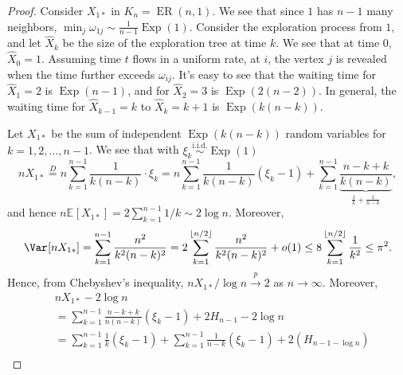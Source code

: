 \begin{proof}
	Consider \(X_{1\ast}\) in \(K_n = \operatorname{ER}(n, 1) \). We see that since \(1\) has \(n-1\) many neighbors, \(\min _j \omega _{1j} \sim \frac{1}{n-1} \operatorname{Exp}(1) \). Consider the exploration process from \(1\), and let \(\hat{X} _k\) be the size of the exploration tree at time \(k\). We see that at time \(0\), \(\hat{X} _0 = 1\). Assuming time \(t\) flows in a uniform rate, at \(i\), the vertex \(j\) is revealed when the time further exceeds \(\omega _{ij}\). It's easy to see that the waiting time for \(\hat{X} _1 = 2\) is \(\operatorname{Exp}(n-1) \), and for \(\hat{X} _2 = 3\) is \(\operatorname{Exp}(2 (n-2)) \). In general, the waiting time for \(\hat{X} _{k-1} = k\) to \(\hat{X} _k = k+1\) is \(\operatorname{Exp}(k (n-k)) \).

	Let \(X_{1 \ast}\) be the sum of independent \(\operatorname{Exp}(k (n-k)) \) random variables for \(k = 1, 2, \dots , n-1\). We see that with \(\xi _k \overset{\text{i.i.d.} }{\sim } \operatorname{Exp}(1) \)
	\[
		n X_{1 \ast}
		\overset{D}{=} n \sum_{k=1}^{n-1} \frac{1}{k (n-k)}\cdot \xi _k
		= n \sum_{k=1}^{n-1} \frac{1}{k (n-k)}(\xi _k - 1) + \sum_{k=1}^{n-1} \underbrace{\frac{n-k+k}{k(n-k)}}_{\frac{1}{k} + \frac{1}{n-k}},
	\]
	and hence \(n \mathbb{E}_{}[X_{1 \ast}] = 2 \sum_{k=1}^{n-1} 1 / k \sim 2 \log n\). Moreover,
	\[
		\Var_{}[n X_{1 \ast}]
		= \sum_{k=1}^{n-1} \frac{n^2}{k^2 (n-k)^2}
		= 2 \sum_{k=1}^{\lfloor n / 2 \rfloor } \frac{n^2}{k^2 (n-k)^2} + o(1)
		\leq 8 \sum_{k=1}^{\lfloor n / 2 \rfloor } \frac{1}{k^2}
		\leq \pi ^2.
	\]
	Hence, from Chebyshev's inequality, \(n X_{1 \ast} / \log n \overset{p}{\to} 2\) as \(n \to \infty \). Moreover,
	\[
		\begin{split}
			 & n X_{1 \ast} - 2 \log n                                                                                                                                                                                                                                                          \\
			 & = \sum_{k=1}^{n-1} \frac{n - k + k}{n(n-k)} (\xi _k - 1) + 2 H_{n-1} - 2 \log n                                                                                                                                                                                                  \\
			 & = \sum_{k=1}^{n-1} \frac{1}{k} (\xi _k - 1) + \sum_{k=1}^{n-1} \frac{1}{n-k} (\xi _k - 1) + 2 (H_{n-1 - \log n})                                                                                                                                                                 \\

\end{split}\]
\end{proof}
